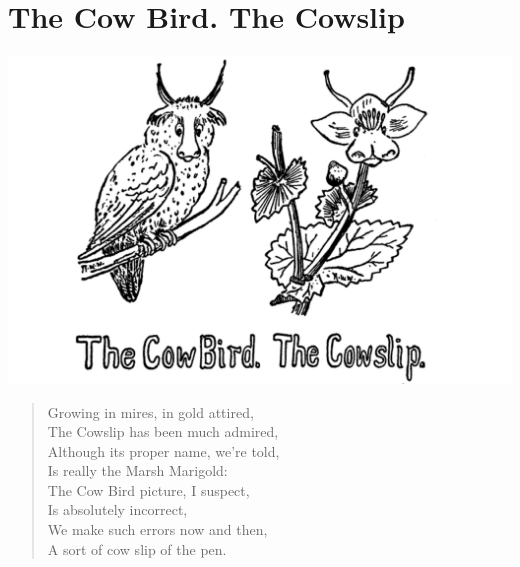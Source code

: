 \documentclass[letterpaper, 10pt, openany]{memoir}
\begin{document}
\chapter{The Cow Bird. The Cowslip}
\includegraphics[width=1\textwidth]{f-p10.png}
\vspace{\onelineskip}
\begin{verse}\huge
Growing in mires, in gold attired,\\
The Cowslip has been much admired,\\
Although its proper name, we're told,\\
Is really the Marsh Marigold:\\
The Cow Bird picture, I suspect,\\
Is absolutely incorrect,\\
We make such errors now and then,\\
A sort of cow slip of the pen.\\
\end{verse}
\vspace{\onelineskip}
\end{document}
